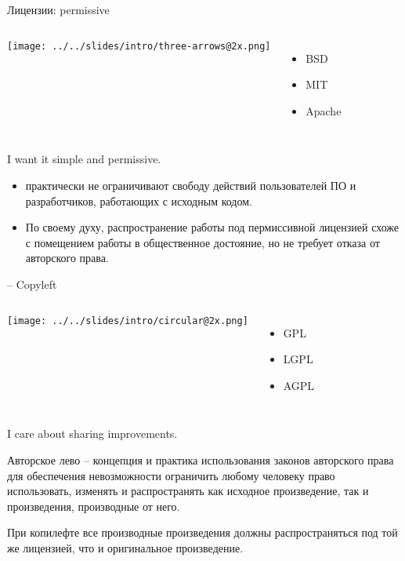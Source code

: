 \begin{frame}{Лицензии: permissive}
	\begin{columns}
		\center\texttt{[image: ../../slides/intro/three-arrows@2x.png]}


	\begin{itemize}
		\item BSD
		\item MIT
		\item Apache
	\end{itemize}
	\end{columns}

	\begin{block}{I want it simple and permissive.}
		\begin{itemize}
			\item практически не ограничивают свободу действий пользователей ПО и разработчиков, работающих с исходным кодом.
			\item По своему духу, распространение работы под пермиссивной лицензией схоже с помещением работы в общественное
				достояние, но не требует отказа от авторского права.
		\end{itemize}
	\end{block}

\end{frame}


\begin{frame}{\textcopyleft -- Copyleft}

	\begin{columns}
	\column{0.3\textwidth}
		\center\texttt{[image: ../../slides/intro/circular@2x.png]}

	\column{0.6\textwidth}

	\begin{itemize}
		\item GPL
		\item LGPL
		\item AGPL
	\end{itemize}
	\end{columns}


	\begin{block}{I care about sharing improvements.}
	
	Авторское лево -- концепция и практика использования законов авторского права для обеспечения 
	невозможности ограничить любому человеку право использовать,  изменять и распространять как 
	исходное произведение,  так и произведения,  производные от него.
	\end{block}


	При копилефте все производные произведения должны распространяться под той же лицензией,
	что и оригинальное произведение.

\end{frame}



